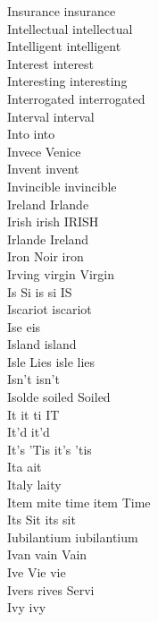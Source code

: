 Insurance insurance\\
Intellectual intellectual\\
Intelligent intelligent\\
Interest interest\\
Interesting interesting\\
Interrogated interrogated\\
Interval interval\\
Into into\\
Invece Venice\\
Invent invent\\
Invincible invincible\\
Ireland Irlande\\
Irish irish IRISH\\
Irlande Ireland\\
Iron Noir iron\\
Irving virgin Virgin\\
Is Si is si IS\\
Iscariot iscariot\\
Ise eis\\
Island island\\
Isle Lies isle lies\\
Isn't isn't\\
Isolde soiled Soiled\\
It it ti IT\\
It'd it'd\\
It's 'Tis it's 'tis\\
Ita ait\\
Italy laity\\
Item mite time item Time\\
Its Sit its sit\\
Iubilantium iubilantium\\
Ivan vain Vain\\
Ive Vie vie\\
Ivers rives Servi\\
Ivy ivy\\

